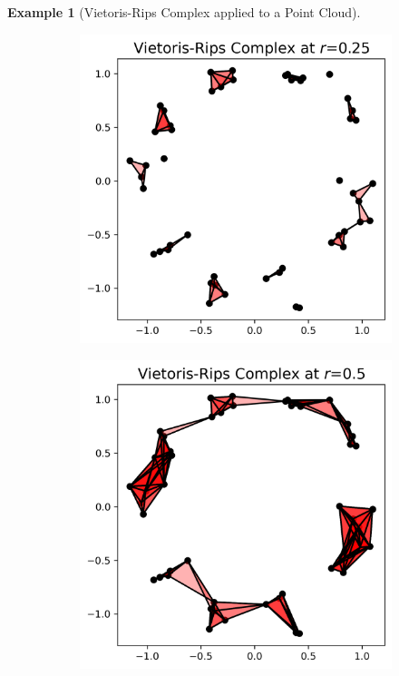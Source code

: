 \documentclass[ma]{uncgdissertationexp}
\theoremstyle{plain}
\theoremstyle{definition}
\newtheorem{example}[theorem]{Example}
\theoremstyle{remark}
\begin{document}
\begin{example}[Vietoris-Rips Complex applied to a Point Cloud]
\begin{figure}[H]
\begin{subfigure}[b]{0.22\textwidth}
    \end{subfigure}
    \hfill
    \begin{subfigure}[b]{0.22\textwidth}
        \centering
        \includegraphics[width=\textwidth]{point_cloud_plot_r0_25.png}
    \end{subfigure}
        \hfill
    \begin{subfigure}[b]{0.22\textwidth}
        \centering
        \includegraphics[width=\textwidth]{point_cloud_plot_r0_5.png}

\end{subfigure}
\end{figure}
\end{example}
\end{document}
